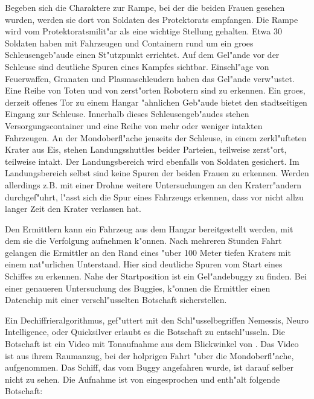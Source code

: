 Begeben sich die Charaktere zur Rampe, bei der die beiden Frauen gesehen wurden, werden sie dort von Soldaten des Protektorats empfangen. Die Rampe wird vom Protektoratsmilit"ar als eine wichtige Stellung gehalten. Etwa 30 Soldaten haben mit Fahrzeugen und Containern rund um ein gro\3es Schleusengeb"aude einen St"utzpunkt errichtet. Auf dem Gel"ande vor der Schleuse sind deutliche Spuren eines Kampfes sichtbar. Einschl"age von Feuerwaffen, Granaten und Plasmaschleudern haben das Gel"ande verw"ustet. Eine Reihe von Toten und von zerst"orten Robotern sind zu erkennen. Ein gro\3es, derzeit offenes Tor zu einem Hangar "ahnlichen Geb"aude bietet den stadtseitigen Eingang zur Schleuse. Innerhalb dieses Schleusengeb"audes stehen Versorgungscontainer und eine Reihe von mehr oder weniger intakten Fahrzeugen. An der Mondoberfl"ache jenseits der Schleuse, in einem zerkl"ufteten Krater aus Eis, stehen Landungsshuttles beider Parteien, teilweise zerst"ort, teilweise intakt. Der Landungsbereich wird ebenfalls von Soldaten gesichert. Im Landungsbereich selbst sind keine Spuren der beiden Frauen zu erkennen. Werden allerdings z.B. mit einer Drohne weitere Untersuchungen an den Kraterr"andern durchgef"uhrt, l"asst sich die Spur eines Fahrzeugs erkennen, dass vor nicht allzu langer Zeit den Krater verlassen hat. 

Den Ermittlern kann ein Fahrzeug aus dem Hangar bereitgestellt werden, mit dem sie die Verfolgung aufnehmen k"onnen. Nach mehreren Stunden Fahrt gelangen die Ermittler an den Rand eines "uber 100 Meter tiefen Kraters mit einem nat"urlichen Unterstand. Hier sind deutliche Spuren vom Start eines Schiffes zu erkennen. Nahe der Startposition ist ein Gel"andebuggy zu finden. Bei einer genaueren Untersuchung des Buggies, k"onnen die Ermittler einen Datenchip mit einer verschl"usselten Botschaft sicherstellen.

Ein Dechiffrieralgorithmus, gef"uttert mit den Schl"usselbegriffen Nemessis, Neuro Intelligence, \xl{} oder Quicksilver erlaubt es die Botschaft zu entschl"usseln. Die Botschaft ist ein Video mit Tonaufnahme aus dem Blickwinkel von \ml{}. Das Video ist aus ihrem Raumanzug, bei der holprigen Fahrt "uber die Mondoberfl"ache, aufgenommen. Das Schiff, das vom Buggy angefahren wurde, ist darauf selber nicht zu sehen. Die Aufnahme ist von \ml{} eingesprochen und enth"alt folgende Botschaft:


